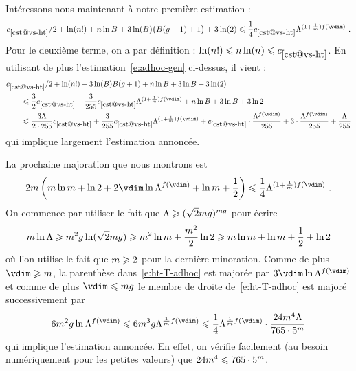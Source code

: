 Intéressons-nous maintenant à notre première estimation  :
\begin{equation} \label{e:B-siegel}
  \cst{vs-ht}/2 + \ln(\dimp!) + \dimp \ln B
  + 3 \ln(B) \bigl( B(\genre+1) + 1 \bigr) + 3 \ln(2)
  \le
  \frac14 \cst{vs-ht} \Lambda^{(1 + \frac1\puiss) f(\vdim)}
  \pmm.
\end{equation}
Pour le deuxième terme, on a par définition :
\(
  \ln(\dimp!)
  \le
  \dimp \ln (\dimp)
  \le
  \cst{vs-ht}
\). En utilisant de plus l'estimation~\eqref{e:adhoc-gen} ci-dessus, il vient :
\begin{align}
  & \cst{vs-ht}/2 + \ln(\dimp!)
  + 3 \ln(B) B(\genre+1) + \dimp \ln B + 3\ln B + 3 \ln(2)
  \\ & \qquad \le
  \frac32 \cst{vs-ht}
  + \frac3{255} \cst{vs-ht} \Lambda^{(1 + \frac1\puiss) f(\vdim)}
  + \dimp \ln B + 3 \ln B + 3 \ln 2
  \\ & \qquad \le
  \frac{3\Lambda}{2\cdot255} \cst{vs-ht}
  + \frac3{255} \cst{vs-ht} \Lambda^{(1 + \frac1\puiss) f(\vdim)}
  + \cst{vs-ht} \cdot \frac{ \Lambda^{f(\vdim)} }{ 255 }
  + 3 \cdot \frac{ \Lambda^{f(\vdim)} }{ 255 }
  + \frac{ \Lambda }{ 255 }
\end{align}
qui implique largement l'estimation annoncée.

\medskip

La prochaine majoration  que nous montrons est
\begin{equation} \label{e:ht-T-adhoc}
  2\puiss \left(
    \puiss \ln \puiss + \ln 2 + 2\vdim \ln \Lambda^{f(\vdim)}
    + \ln \puiss + \frac12
  \right)
  \le
  \frac14 \Lambda^{ (1 + \frac1\puiss) f(\vdim) }
  \pmm.
\end{equation}
On commence par utiliser le fait que \( \Lambda \geqslant (\sqrt2
  mg)^{mg} \) pour écrire
\begin{equation}
  m \ln \Lambda
  \geqslant
  m^2 g \ln( \sqrt2 m g )
  \geqslant
  m^2 \ln m + \frac{ m^2 }2 \ln 2
  \geqslant
  m \ln m + \ln m + \frac12 + \ln 2
\end{equation}
où l'on utilise le fait que \( m \geqslant 2 \) pour la dernière minoration.
Comme de plus \( \vdim \ge \puiss \), la parenthèse dans~\eqref{e:ht-T-adhoc}
est majorée par \( 3\vdim \ln \Lambda^{f(\vdim)} \) et comme de plus \( \vdim
  \le \puiss\genre \) le membre de droite de~\eqref{e:ht-T-adhoc} est majoré
successivement par
\begin{equation}
  6 \puiss^2 \genre \ln \Lambda^{f(\vdim)}
  \le
  6 \puiss^3 \genre \Lambda^{\frac1\puiss f(\vdim)}
  \le
  \frac14 \Lambda^{\frac1\puiss f(\vdim)}
  \cdot \frac{ 24 \puiss^4 \Lambda }{ 765 \cdot 5^\puiss }
\end{equation}
qui implique l'estimation annoncée. En effet, on vérifie facilement (au besoin
numériquement pour les petites valeurs) que \( 24 m^4 \leqslant 765 \cdot
  5^m \).


